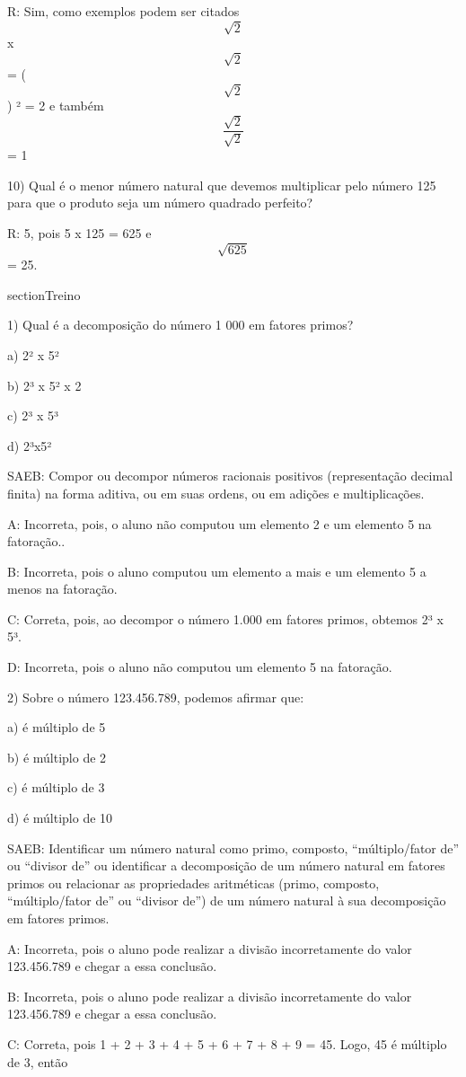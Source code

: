 R: Sim, como exemplos podem ser citados \[\sqrt{2}\] x \[\sqrt{2}\] =
(\[\sqrt{2}\]) ² = 2 e também \[\frac{\sqrt{2}}{\sqrt{2}}\] = 1

10) Qual é o menor número natural que devemos multiplicar pelo número
125 para que o produto seja um número quadrado perfeito?

R: 5, pois 5 x 125 = 625 e \[\sqrt{625}\] = 25.

section{Treino}

1) Qual é a decomposição do número 1 000 em fatores primos?

a) 2² x 5²

b) 2³ x 5² x 2

c) 2³ x 5³

d) 2³x5²

SAEB: Compor ou decompor números racionais positivos (representação
decimal finita) na forma aditiva, ou em suas ordens, ou em adições e
multiplicações.

A: Incorreta, pois, o aluno não computou um elemento 2 e um elemento 5
na fatoração..

B: Incorreta, pois o aluno computou um elemento a mais e um elemento 5 a
menos na fatoração.

C: Correta, pois, ao decompor o número 1.000 em fatores primos, obtemos
2³ x 5³.

D: Incorreta, pois o aluno não computou um elemento 5 na fatoração.

2) Sobre o número 123.456.789, podemos afirmar que:

a) é múltiplo de 5

b) é múltiplo de 2

c) é múltiplo de 3

d) é múltiplo de 10

SAEB: Identificar um número natural como primo, composto,
``múltiplo/fator de'' ou ``divisor de'' ou identificar a decomposição de
um número natural em fatores primos ou relacionar as propriedades
aritméticas (primo, composto, ``múltiplo/fator de'' ou ``divisor de'')
de um número natural à sua decomposição em fatores primos.

A: Incorreta, pois o aluno pode realizar a divisão incorretamente do
valor 123.456.789 e chegar a essa conclusão.

B: Incorreta, pois o aluno pode realizar a divisão incorretamente do
valor 123.456.789 e chegar a essa conclusão.

C: Correta, pois 1 + 2 + 3 + 4 + 5 + 6 + 7 + 8 + 9 = 45. Logo, 45 é
múltiplo de 3, então

